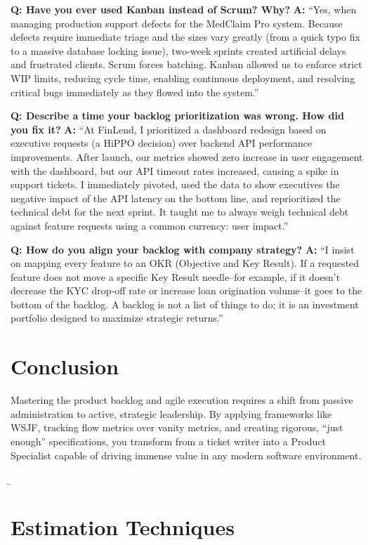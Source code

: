 \documentclass[
  11pt,
  openany,
  oneside]{book}
\begin{document}
\textbf{Q: Have you ever used Kanban instead of Scrum? Why?} \textbf{A:}
``Yes, when managing production support defects for the MedClaim Pro
system. Because defects require immediate triage and the sizes vary
greatly (from a quick typo fix to a massive database locking issue),
two-week sprints created artificial delays and frustrated clients. Scrum
forces batching. Kanban allowed us to enforce strict WIP limits,
reducing cycle time, enabling continuous deployment, and resolving
critical bugs immediately as they flowed into the system.''

\textbf{Q: Describe a time your backlog prioritization was wrong. How
did you fix it?} \textbf{A:} ``At FinLend, I prioritized a dashboard
redesign based on executive requests (a HiPPO decision) over backend API
performance improvements. After launch, our metrics showed zero increase
in user engagement with the dashboard, but our API timeout rates
increased, causing a spike in support tickets. I immediately pivoted,
used the data to show executives the negative impact of the API latency
on the bottom line, and reprioritized the technical debt for the next
sprint. It taught me to always weigh technical debt against feature
requests using a common currency: user impact.''

\textbf{Q: How do you align your backlog with company strategy?}
\textbf{A:} ``I insist on mapping every feature to an OKR (Objective and
Key Result). If a requested feature does not move a specific Key Result
needle--for example, if it doesn't decrease the KYC drop-off rate or
increase loan origination volume--it goes to the bottom of the backlog.
A backlog is not a list of things to do; it is an investment portfolio
designed to maximize strategic returns.''

\section{Conclusion}\label{conclusion-4}

Mastering the product backlog and agile execution requires a shift from
passive administration to active, strategic leadership. By applying
frameworks like WSJF, tracking flow metrics over vanity metrics, and
creating rigorous, ``just enough'' specifications, you transform from a
ticket writer into a Product Specialist capable of driving immense value
in any modern software environment.

\b

\section{Estimation Techniques}\label{estimation-techniques}
\end{document}
